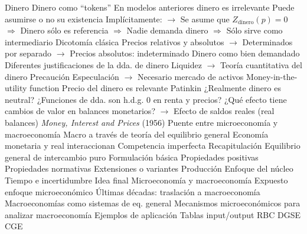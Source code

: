 \documentclass{nuevotema}
\begin{document}
\begin{esquemal}
		\2 Dinero
			\3 Dinero como ``tokens''
				\4 En modelos anteriores dinero es irrelevante
				\4[] Puede asumirse o no su existencia
				\4[] Implícitamente:
				\4[] $\to$ Se asume que $Z_\text{dinero}(p) = 0$
				\4[] $\Rightarrow$ Dinero sólo es referencia
				\4[] $\Rightarrow$ Nadie demanda dinero
				\4[] $\Rightarrow$ Sólo sirve como intermediario
				\4 Dicotomía clásica
				\4[] Precios relativos y absolutos
				\4[] $\to$ Determinados por separado
				\4[] $\to$ Precios absolutos: indeterminado
			\3 Dinero como bien demandado
				\4 Diferentes justificaciones de la dda. de dinero
				\4[] Liquidez
				\4[] $\to$ Teoría cuantitativa del dinero
				\4[] Precaución
				\4[] Especulación
				\4[] $\to$ Necesario mercado de activos
				\4[] Money-in-the-utility function
				\4[$\Rightarrow$] Precio del dinero es relevante
			\3 Patinkin
				\4 ¿Realmente dinero es neutral?
				\4 ¿Funciones de dda. son h.d.g. 0 en renta y precios?
				\4 ¿Qué efecto tiene cambios de valor en balances monetarios?
				\4[] $\to$ Efecto de saldos reales (real balances)
				\4 \textit{Money, Interest and Prices} (1956)
				\4 Puente entre microeconomía y macroeconomía
				\4[] Macro a través de teoría del equilibrio general
				\4[$\Rightarrow$] Economía monetaria y real interaccionan
			\3 Competencia imperfecta
	\1[] 
		\2 Recapitulación
			\3 Equilibrio general de intercambio puro
				\4 Formulación básica
				\4 Propiedades positivas
				\4 Propiedades normativas
			\3 Extensiones o variantes
				\4 Producción
				\4 Enfoque del núcleo
				\4 Tiempo e incertidumbre
		\2 Idea final
			\3 Microeconomía y macroeconomía
				\4 Expuesto enfoque microeconómico
				\4 Últimas décadas: traslación a macroeconomía
				\4[] Macroeconomías como sistemas de eq. general
				\4[] Mecanismos microeconómicos para analizar macroeconomía
			\3 Ejemplos de aplicación
				\4 Tablas input/output
				\4 RBC
				\4 DGSE
				\4 CGE
\end{esquemal}
\end{document}
